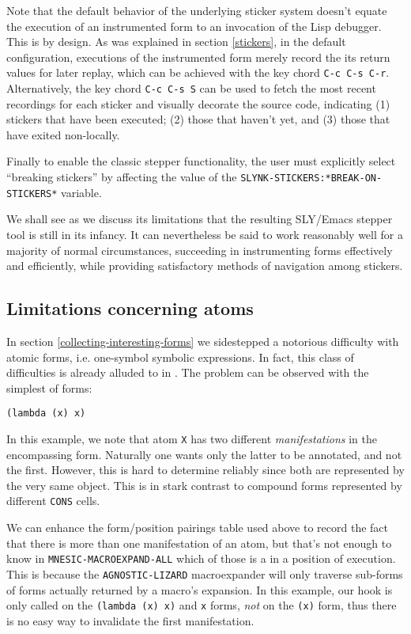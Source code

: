 \documentclass[sigconf]{acmart}
\begin{document}
Note that the default behavior of the underlying sticker system
doesn't equate the execution of an instrumented form to an invocation
of the Lisp debugger.  This is by design.  As was explained in section
\ref{stickers}, in the default configuration, executions of the
instrumented form merely record the its return values for later
replay, which can be achieved with the key chord \texttt{C-c C-s C-r}.
Alternatively, the key chord \texttt{C-c C-s S} can be used to fetch
the most recent recordings for each sticker and visually decorate the
source code, indicating (1) stickers that have been executed; (2)
those that haven't yet, and (3) those that have exited non-locally.

Finally to enable the classic stepper functionality, the user must
explicitly select ``breaking stickers'' by affecting the value of the
\texttt{SLYNK-STICKERS:*BREAK-ON-STICKERS*} variable. 

We shall see as we discuss its limitations that the resulting
SLY/Emacs stepper tool is still in its infancy.  It can nevertheless
be said to work reasonably well for a majority of normal
circumstances, succeeding in instrumenting forms effectively and
efficiently, while providing satisfactory methods of navigation among
stickers.

\subsection{Limitations concerning atoms}\label{atoms}

In section \ref{collecting-interesting-forms} we sidestepped a
notorious difficulty with atomic forms, i.e. one-symbol symbolic
expressions.  In fact, this class of difficulties is already alluded
to in \cite[I-4.8]{annotation-based}.  The problem can be observed
with the simplest of forms:

\begin{verbatim}
(lambda (x) x)
\end{verbatim}

In this example, we note that atom \texttt{X} has two different
\emph{manifestations} in the encompassing form.  Naturally one wants
only the latter to be annotated, and not the first.  However, this is
hard to determine reliably since both are represented by the very same
object.  This is in stark contrast to compound forms represented by
different \texttt{CONS} cells.

We can enhance the form/position pairings table used above to record
the fact that there is more than one manifestation of an atom, but
that's not enough to know in \texttt{MNESIC-MACROEXPAND-ALL} which of
those is a in a position of execution.  This is because the
\texttt{AGNOSTIC-LIZARD} macroexpander will only traverse sub-forms of
forms actually returned by a macro's expansion.  In this example, our
hook is only called on the \texttt{(lambda (x) x)} and \texttt{x} forms,
\emph{not} on the \texttt{(x)} form, thus there is no easy way to
invalidate the first manifestation.
\end{document}
